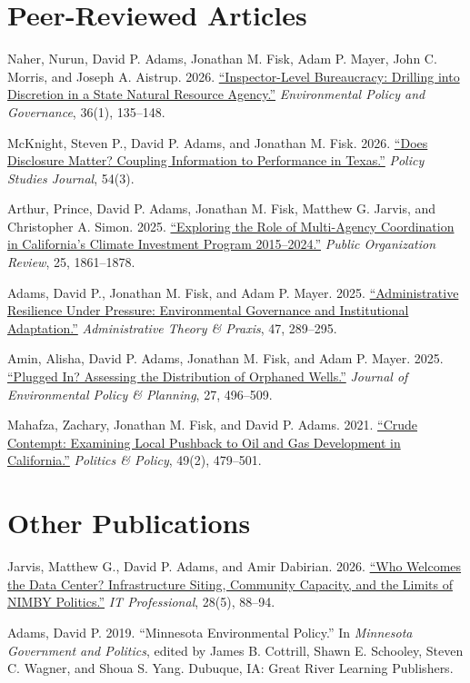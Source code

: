 \documentclass[10pt,letterpaper]{article}
\renewenvironment{itemize}{
  \begin{list}{}{
    \setlength{\leftmargin}{1.5em}
    \setlength{\itemsep}{0.08em}
    \setlength{\parskip}{0pt}
    \setlength{\parsep}{0.08em}
  }
}{
  \end{list}
}
\begin{document}
\section*{Peer-Reviewed Articles}
\begin{itemize}\leftmargin=2pt\itemindent=-15pt
  \item Naher, Nurun, David P. Adams, Jonathan M. Fisk, Adam P. Mayer, John C. Morris, and Joseph A. Aistrup. 2026. \href{https://doi.org/10.1002/eet.70038}{``Inspector-Level Bureaucracy: Drilling into Discretion in a State Natural Resource Agency.''} \emph{Environmental Policy and Governance}, 36(1), 135--148.
  \item McKnight, Steven P., David P. Adams, and Jonathan M. Fisk. 2026. \href{https://doi.org/10.1111/psj.70064}{``Does Disclosure Matter? Coupling Information to Performance in Texas.''} \emph{Policy Studies Journal}, 54(3).
  \item Arthur, Prince, David P. Adams, Jonathan M. Fisk, Matthew G. Jarvis, and Christopher A. Simon. 2025. \href{https://doi.org/10.1007/s11115-025-00958-2}{``Exploring the Role of Multi-Agency Coordination in California's Climate Investment Program 2015--2024.''} \emph{Public Organization Review}, 25, 1861--1878.
  \item Adams, David P., Jonathan M. Fisk, and Adam P. Mayer. 2025. \href{https://doi.org/10.1080/10841806.2025.2537600}{``Administrative Resilience Under Pressure: Environmental Governance and Institutional Adaptation.''} \emph{Administrative Theory \& Praxis}, 47, 289--295.
  \item Amin, Alisha, David P. Adams, Jonathan M. Fisk, and Adam P. Mayer. 2025. \href{https://doi.org/10.1080/1523908X.2025.2480289}{``Plugged In? Assessing the Distribution of Orphaned Wells.''} \emph{Journal of Environmental Policy \& Planning}, 27, 496--509.
  \item Mahafza, Zachary, Jonathan M. Fisk, and David P. Adams. 2021. \href{https://doi.org/10.1111/polp.12401}{``Crude Contempt: Examining Local Pushback to Oil and Gas Development in California.''} \emph{Politics \& Policy}, 49(2), 479--501.
\end{itemize}

\section*{Other Publications}
\begin{itemize}\leftmargin=2pt\itemindent=-15pt
  \item Jarvis, Matthew G., David P. Adams, and Amir Dabirian. 2026. \href{https://doi.org/10.1109/MITP.2026.3732817}{``Who Welcomes the Data Center? Infrastructure Siting, Community Capacity, and the Limits of NIMBY Politics.''} \emph{IT Professional}, 28(5), 88--94.
  \item Adams, David P. 2019. ``Minnesota Environmental Policy.'' In \emph{Minnesota Government and Politics}, edited by James B. Cottrill, Shawn E. Schooley, Steven C. Wagner, and Shoua S. Yang. Dubuque, IA: Great River Learning Publishers.
\end{itemize}
\end{document}
